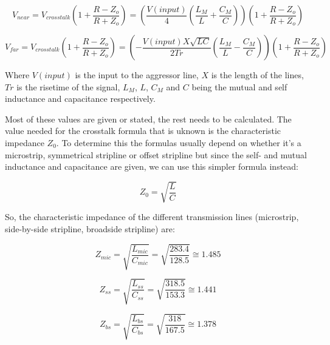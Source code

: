 \documentclass[../main.tex]{subfiles}
\begin{document}
\begin{equation*}
    V_{near} = V_{crosstalk} \left(1+ \frac{R-Z_o}{R+Z_o} \right) = \left(\frac{V(input)}{4} \left(\frac{L_M}{L} + \frac{C_M}{C} \right) \right) \left(1+ \frac{R-Z_o}{R+Z_o} \right)
\end{equation*}

\begin{equation*}
    V_{far} = V_{crosstalk} \left(1+ \frac{R-Z_o}{R+Z_o} \right) = \left(-\frac{V(input)X\sqrt{LC}}{2Tr} \left(\frac{L_M}{L} - \frac{C_M}{C} \right) \right) \left(1+ \frac{R-Z_o}{R+Z_o} \right)
\end{equation*}

Where $V(input)$ is the input to the aggressor line, $X$ is the length of the lines, $Tr$ is the risetime of the signal, $L_M$, $L$, $C_M$ and $C$ being the mutual and self inductance and capacitance respectively.

\vspace{10pt}
Most of these values are given or stated, the rest needs to be calculated. The value needed for the crosstalk formula that is uknown is the characteristic impedance $Z_0$. To determine this the formulas usually depend on whether it's a microstrip, symmetrical stripline or offset stripline but since the self- and mutual inductance and capacitance are given, we can use this simpler formula instead:

\begin{equation*}
    Z_0 = \sqrt{\frac{L}{C}}
\end{equation*}

\vspace{10pt}

So, the characteristic impedance of the different transmission lines (microstrip, side-by-side stripline, broadside stripline) are:

\begin{equation}
    Z_{mic} = \sqrt{\frac{L_{mic}}{C_{mic}}} = \sqrt{\frac{283.4}{128.5}} \cong 1.485
\label{eq:z_mic}
\end{equation}

\begin{equation}
    Z_{ss} = \sqrt{\frac{L_{ss}}{C_{ss}}} = \sqrt{\frac{318.5}{153.3}} \cong 1.441
\label{eq:z_ss}
\end{equation}

\begin{equation}
    Z_{bs} = \sqrt{\frac{L_{bs}}{C_{bs}}} = \sqrt{\frac{318}{167.5}} \cong 1.378
\label{eq:z_bs}
\end{equation}
\end{document}
